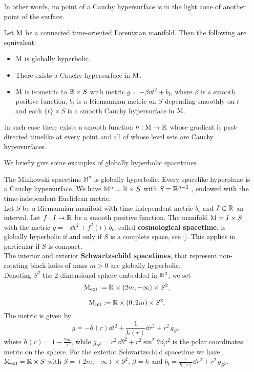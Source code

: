 \noindent In other words, no point of a Cauchy hypersurface is in the light cone of another point of the surface.
\begin{theorem}
	Let $\mathrm{M}$ be a connected time-oriented Lorentzian manifold. Then the following are equivalent:
	\begin{itemize}
		\item $\mathrm{M}$ is globally hyperbolic.
		\item There exists a Cauchy hypersurface in $\mathrm{M}$.
		\item $\mathrm{M}$ is isometric to ${\mathbb R}\times S$ with metric $g=-\beta\dd t^2+b_t$, where $\beta$ is a smooth positive function, $b_t$ is a Riemannian metric on $S$ depending smoothly on $t$ and each $\{t\}\times S$ is a smooth Cauchy hypersurface in $\mathrm{M}$.
	\end{itemize}
	In such case there exists a smooth function $h:\mathrm{M}\to{\mathbb R}$ whose gradient is past-directed timelike at every point and all of whose level sets are Cauchy hypersurfaces.
	\label{th:Bernal}
\end{theorem}
\noindent We briefly give some examples of globally hyperbolic spacetimes.
\begin{example}
	The Minkowski spacetime $\mathbb{M}^n$ is globally hyperbolic. Every
	spacelike hyperplane is a Cauchy hypersurface. We have $\mathbb{M}^n={\mathbb R}\times S$ with $S = {\mathbb R}^{n-1}$ , endowed	with the time-independent Euclidean metric.\\
	
\noindent	Let $S$ be a Riemannian manifold with time independent metric $b_t$ and $I\subset{\mathbb R}$ an interval. Let $f: I\to{\mathbb R}$
	be a smooth positive function. The manifold $\mathrm{M}=I \times S$ with the metric $g = -\dd t^2 + f^2(t)\, b_t$, called \textbf{cosmological spacetime},
	is globally hyperbolic if and only if $S$ is a complete space, see [\citealp[Lem A.5.14]{bar1}]. This applies in particular if $S$ is compact.\\
	
	\noindent The interior and exterior \textbf{Schwartzschild spacetimes}, that represent non-rotating black holes of mass $m>0$ are globally hyperbolic.\\
	Denoting $S^2$ the $2$-dimensional sphere embedded in ${\mathbb R}^3$, we set
	\[	\mathrm{M}_{\text{ext}}:={\mathbb R}\times(2m,+\infty)	\times S^2,	\] 
	
	\[	\mathrm{M}_{\text{int}}:={\mathbb R}\times(0,2m)	\times S^2.	\] 
	The metric is given by
	\[	g=-h(r)\dd t^2+\frac{1}{h(r)}\dd r^2	+r^2\,g_{S^2},	\]
	where $h(r)=1-\frac{2m}{r}$, while $g_{S^2}=r^2\,\dd\theta^2+r^2\sin^2\theta\dd\varphi^2$ is the polar coordinates metric on the sphere. For the exterior Schwartzschild spacetime we have $\mathrm{M}_{\text{ext}}={\mathbb R}\times S$ with $S=(2m,+\infty)\times S^2$, $\beta=h$ and $b_t=\frac{1}{h(r)}\dd r^2	+r^2\,g_{S^2}$.
	\label{ex:spacetimes}
\end{example}




